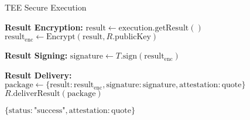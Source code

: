 \begin{tcolorbox}
\begin{protocol}{TEE Secure Execution}
\begin{algorithmic}[1]
\State \textbf{Result Encryption:}
\State $\text{result} \gets \text{execution}.\text{getResult}()$
\State $\text{result}_{\text{enc}} \gets \text{Encrypt}(\text{result}, R.\text{publicKey})$

\State \textbf{Result Signing:}
\State $\text{signature} \gets T.\text{sign}(\text{result}_{\text{enc}})$

\State \textbf{Result Delivery:}
\State $\text{package} \gets \{\text{result}: \text{result}_{\text{enc}}, \text{signature}: \text{signature}, \text{attestation}: \text{quote}\}$
\State $R.\text{deliverResult}(\text{package})$

\State \Return $\{\text{status}: \text{"success"}, \text{attestation}: \text{quote}\}$
\end{algorithmic}
\end{protocol}
\end{tcolorbox}

